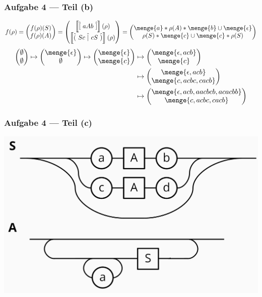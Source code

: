 \documentclass{beamer}
\newcommand{\opt}[2]{\hat{(} \ #1 \ \hat{|} \ #2 \ \hat{)}}
\newcommand{\byp}[1]{\hat{[} \ #1 \ \hat{]}}
\newcommand{\sem}[1]{\left\llbracket #1 \right\rrbracket}
\begin{document}
\begin{frame} \frametitle{Aufgabe 4 --- Teil (b)}
	\begin{align*}
		f(\rho) = \begin{pmatrix} f(\rho)(S) \\ f(\rho)(A) \end{pmatrix} 
		= \begin{pmatrix} \sem{\byp{aAb}}(\rho) \\ \sem{\opt{Sc}{cS}}(\rho) \end{pmatrix} 
		= \begin{pmatrix}
		\menge{a} * \rho(A) * \menge{b} \cup \menge{\epsilon} \\ \rho(S) * \menge{c} \cup \menge{c} * \rho(S)
		\end{pmatrix}
	\end{align*}
	\begin{align*}
		\begin{pmatrix} \emptyset \\ \emptyset \end{pmatrix}
		\mapsto
		\begin{pmatrix} \menge{\epsilon} \\ \emptyset \end{pmatrix}
		\mapsto
		\begin{pmatrix} \menge{\epsilon} \\ \menge{c} \end{pmatrix}
		&\mapsto
		\begin{pmatrix} \menge{\epsilon,acb} \\ \menge{c} \end{pmatrix} \\
		&\mapsto
		\begin{pmatrix} \menge{\epsilon,acb} \\ \menge{c,acbc,cacb} \end{pmatrix} \\
		&\mapsto
		\begin{pmatrix} \menge{\epsilon,acb,aacbcb,acacbb} \\ \menge{c,acbc,cacb} \end{pmatrix}
	\end{align*}
\end{frame}

\begin{frame} \frametitle{Aufgabe 4 --- Teil (c)}
	\centering
	\includegraphics[width=\textwidth]{tut03_syntax_dia_4c.jpg}
\end{frame}
\end{document}
